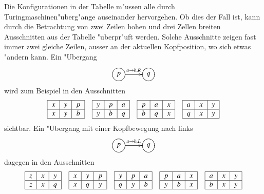 Die Konfigurationen in der Tabelle m"ussen alle durch
Turingmaschinen"uberg"ange auseinander hervorgehen. Ob dies
der Fall ist, kann durch die Betrachtung von zwei Zeilen
hohen und drei Zellen breiten Ausschnitten aus der Tabelle
"uberpr"uft werden. Solche Ausschnitte zeigen fast immer zwei
gleiche Zeilen, ausser an der aktuellen Kopfposition, wo
sich etwas "andern kann. Ein "Ubergang
\[
\entrymodifiers={++[o][F]}
\xymatrix{
p\ar[r]^{a\to b,R}
	&q
}
\]
wird zum Beispiel in den Ausschnitten
\[
\begin{tabular}{|c|c|c|}
\hline
$x$&$y$&$p$\\
\hline
$x$&$y$&$b$\\
\hline
\end{tabular}
\quad
\begin{tabular}{|c|c|c|}
\hline
$y$&$p$&$a$\\
\hline
$y$&$b$&$q$\\
\hline
\end{tabular}
\quad
\begin{tabular}{|c|c|c|}
\hline
$p$&$a$&$x$\\
\hline
$b$&$q$&$x$\\
\hline
\end{tabular}
\quad
\begin{tabular}{|c|c|c|}
\hline
$a$&$x$&$y$\\
\hline
$q$&$x$&$y$\\
\hline
\end{tabular}
\]
sichtbar. Ein "Ubergang mit einer Kopfbewegung nach links
\[
\entrymodifiers={++[o][F]}
\xymatrix{
p\ar[r]^{a\to b,L}
	&q
}
\]
dagegen in den Ausschnitten
\[
\begin{tabular}{|c|c|c|}
\hline
$z$&$x$&$y$\\
\hline
$z$&$x$&$q$\\
\hline
\end{tabular}
\quad
\begin{tabular}{|c|c|c|}
\hline
$x$&$y$&$p$\\
\hline
$x$&$q$&$y$\\
\hline
\end{tabular}
\quad
\begin{tabular}{|c|c|c|}
\hline
$y$&$p$&$a$\\
\hline
$q$&$y$&$b$\\
\hline
\end{tabular}
\quad
\begin{tabular}{|c|c|c|}
\hline
$p$&$a$&$x$\\
\hline
$y$&$b$&$x$\\
\hline
\end{tabular}
\quad
\begin{tabular}{|c|c|c|}
\hline
$a$&$x$&$y$\\
\hline
$b$&$x$&$y$\\
\hline
\end{tabular}
\]
